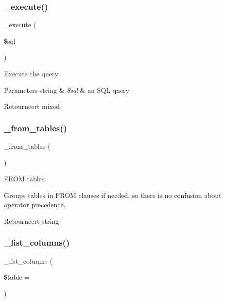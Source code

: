 \subsubsection{\texorpdfstring{\_execute()}{\_execute()}}
{\footnotesize\ttfamily \+\_\+execute (\begin{DoxyParamCaption}\item[{}]{\$sql }\end{DoxyParamCaption})\hspace{0.3cm}{\ttfamily [protected]}}

Execute the query


\begin{DoxyParams}[1]{Parameters}
string & {\em \$sql} & an S\+QL query \\
\hline
\end{DoxyParams}
\begin{DoxyReturn}{Retourneert}
mixed 
\end{DoxyReturn}
\mbox{\label{class_c_i___d_b__mysql__driver_aef43f7e3e7b71d337ff3724c5eb14f10}} 
\subsubsection{\texorpdfstring{\_from\_tables()}{\_from\_tables()}}
{\footnotesize\ttfamily \+\_\+from\+\_\+tables (\begin{DoxyParamCaption}{ }\end{DoxyParamCaption})\hspace{0.3cm}{\ttfamily [protected]}}

F\+R\+OM tables

Groups tables in F\+R\+OM clauses if needed, so there is no confusion about operator precedence.

\begin{DoxyReturn}{Retourneert}
string 
\end{DoxyReturn}
\mbox{\label{class_c_i___d_b__mysql__driver_a7ccb7f9c301fe7f0a9db701254142b63}} 
\subsubsection{\texorpdfstring{\_list\_columns()}{\_list\_columns()}}
{\footnotesize\ttfamily \+\_\+list\+\_\+columns (\begin{DoxyParamCaption}\item[{}]{\$table = {\ttfamily \textquotesingle{}\textquotesingle{}} }\end{DoxyParamCaption})\hspace{0.3cm}{\ttfamily [protected]}}

